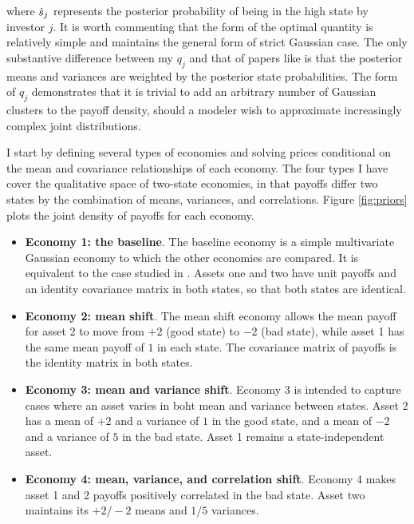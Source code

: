 \documentclass{article}
\begin{document}
\noindent where $\hat s_j$ represents the posterior probability of being in the high state by investor $j$. It is worth commenting that the form of the optimal quantity is relatively simple and maintains the general form of strict Gaussian case. The only substantive difference between my $q_j$ and that of papers like \textcite{kacperczyk_rational_2016} is that the posterior means and variances are weighted by the posterior state probabilities. The form of $q_j$ demonstrates that it is trivial to add an arbitrary number of Gaussian clusters to the payoff density, should a modeler wish to approximate increasingly complex joint distributions.

I start by defining several types of economies and solving prices conditional on the mean and covariance relationships of each economy. The four types I have cover the qualitative space of two-state economies, in that payoffs differ two states by the combination of means, variances, and correlations. Figure \ref{fig:priors} plots the joint density of payoffs for each economy.

\begin{itemize}
    \item \textbf{Economy 1: the baseline}. The baseline economy is a simple multivariate Gaussian economy to which the other economies are compared. It is equivalent to the case studied in \textcite{kacperczyk_rational_2016}. Assets one and two have unit payoffs and an identity covariance matrix in both states, so that both states are identical.
    
    \item \textbf{Economy 2: mean shift}. The mean shift economy allows the mean payoff for asset 2 to move from $+2$ (good state) to $-2$ (bad state), while asset 1 has the same mean payoff of $1$ in each state. The covariance matrix of payoffs is the identity matrix in both states.

    \item \textbf{Economy 3: mean and variance shift}. Economy 3 is intended to capture cases where an asset varies in boht mean and variance between states. Asset 2 has a mean of $+2$ and a variance of $1$ in the good state, and a mean of $-2$ and a variance of $5$ in the bad state. Asset 1 remains a state-independent asset.
    
    \item \textbf{Economy 4: mean, variance, and correlation shift}. Economy 4 makes asset 1 and 2 payoffs positively correlated in the bad state. Asset two maintains its $+2/-2$ means and $1/5$ variances.
\end{itemize}
    
\end{document}
